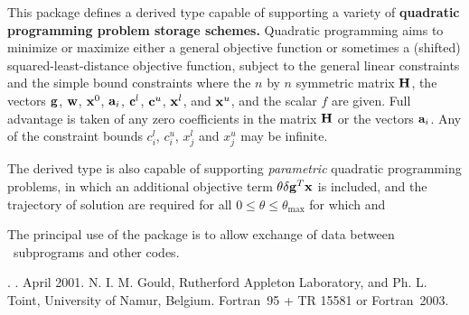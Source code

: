 \documentclass{galahad}
\newcommand{\packagename}{QPT}
\newcommand{\fullpackagename}{\libraryname\_\packagename}
\begin{document}
\galheader


\galsummary
This package defines a derived type capable of supporting
a variety of {\bf quadratic programming problem storage schemes.}
Quadratic programming aims to minimize or maximize either
a general objective function
or sometimes a (shifted) squared-least-distance objective function,
subject to the general linear constraints
and the simple bound constraints
where the $n$ by $n$ symmetric matrix ${\mathbf{H}}$,
the vectors ${\mathbf{g}}$, ${\mathbf{w}}$, ${\mathbf{x}}^{0}$,
${\mathbf{a}}_{i}$, ${\mathbf{c}}^{l}$, ${\mathbf{c}}^{u}$, ${\mathbf{x}}^{l}$,
and ${\mathbf{x}}^{u}$, and the scalar $f$ are given.
Full advantage is taken of any zero coefficients in the matrix ${\mathbf{H}}$ or the
vectors ${\mathbf{a}}_{i}$.
Any of the constraint bounds $c_{i}^{l}$, $c_{i}^{u}$,
$x_{j}^{l}$ and $x_{j}^{u}$ may be infinite.

The derived type is also capable of supporting {\em parametric}
quadratic programming problems, in which an additional objective
term $\theta \delta {\mathbf{g}}^T {\mathbf{x}}$ is included, and the trajectory of
solution are required for all $0 \leq \theta \leq \theta_{\max}$
for which
and

The principal use of the package is to allow exchange of data between
\galahad\ subprograms and other codes.


\galattributes
\galversions{\tt  \fullpackagename\_single, \fullpackagename\_double}.
.
\galdate April 2001.
\galorigin N. I. M. Gould, Rutherford Appleton Laboratory, and
Ph. L. Toint, University of Namur, Belgium.
\gallanguage Fortran~95 + TR 15581 or Fortran~2003.


\galhowto

\end{document}
